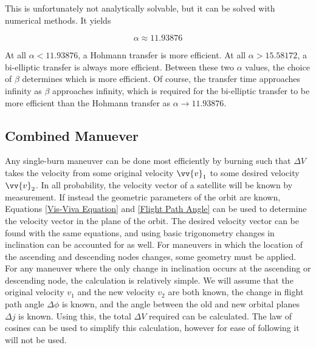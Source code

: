 \documentclass[../main.tex]{subfiles}
\begin{document}
This is unfortunately not analytically solvable, but it can be solved with numerical methods. It yields

$$\alpha\approx11.93876$$

At all $\alpha<11.93876$, a Hohmann transfer is more efficient. At all $\alpha>15.58172$, a bi-elliptic transfer is always more efficient. Between these two $\alpha$ values, the choice of $\beta$ determines which is more efficient. Of course, the transfer time approaches infinity as $\beta$ approaches infinity, which is required for the bi-elliptic transfer to be more efficient than the Hohmann transfer as $\alpha\rightarrow11.93876$.

\bigskip\bigskip
\subsection{Combined Manuever}

Any single-burn maneuver can be done most efficiently by burning such that $\Delta V$ takes the velocity from some original velocity $\vv{v}_1$ to some desired velocity $\vv{v}_2$. In all probability, the velocity vector of a satellite will be known by measurement. If instead the geometric parameters of the orbit are known, Equations \eqref{Vis-Viva Equation} and \eqref{Flight Path Angle} can be used to determine the velocity vector in the plane of the orbit. The desired velocity vector can be found with the same equations, and using basic trigonometry changes in inclination can be accounted for as well. For maneuvers in which the location of the ascending and descending nodes changes, some geometry must be applied. For any maneuver where the only change in inclination occurs at the ascending or descending node, the calculation is relatively simple. We will assume that the original velocity $v_1$ and the new velocity $v_2$ are both known, the change in flight path angle $\Delta \phi$ is known, and the angle between the old and new orbital planes $\Delta j$ is known. Using this, the total $\Delta V$ required can be calculated. The law of cosines can be used to simplify this calculation, however for ease of following it will not be used.
\end{document}
